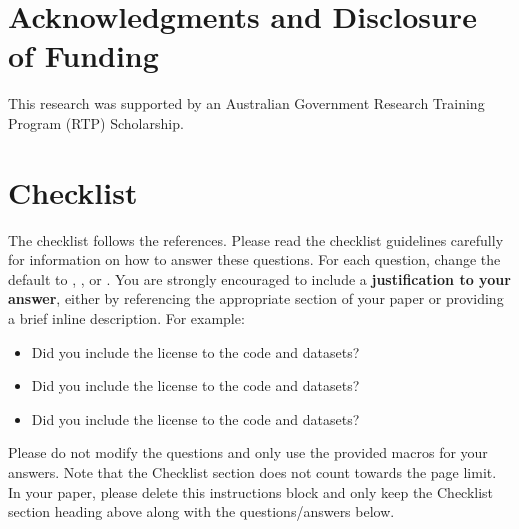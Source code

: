 \documentclass{article}
\newif\ifpreprint
\begin{document}
\section*{Acknowledgments and Disclosure of Funding}
This research was supported by an Australian Government Research Training Program (RTP) Scholarship.

\newpage





\ifpreprint
\else

\section*{Checklist}

The checklist follows the references.  Please
read the checklist guidelines carefully for information on how to answer these
questions.  For each question, change the default \answerTODO{} to \answerYes{},
\answerNo{}, or \answerNA{}.  You are strongly encouraged to include a {\bf
justification to your answer}, either by referencing the appropriate section of
your paper or providing a brief inline description.  For example:
\begin{itemize}
  \item Did you include the license to the code and datasets? 
  \item Did you include the license to the code and datasets? 
  \item Did you include the license to the code and datasets? \answerNA{}
\end{itemize}
Please do not modify the questions and only use the provided macros for your
answers.  Note that the Checklist section does not count towards the page
limit.  In your paper, please delete this instructions block and only keep the
Checklist section heading above along with the questions/answers below.
\end{document}

